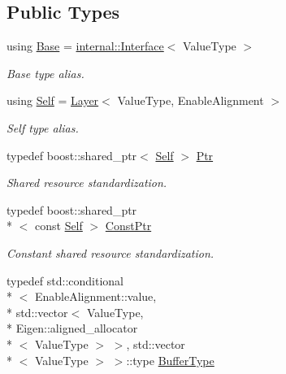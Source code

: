 \subsection*{Public Types}
\begin{DoxyCompactItemize}
\item 
using \hyperlink{classffnn_1_1layer_1_1_layer_aef88481ace189a82a4576931ef964f7d}{Base} = \hyperlink{classffnn_1_1layer_1_1internal_1_1_interface}{internal\-::\-Interface}$<$ Value\-Type $>$
\begin{DoxyCompactList}\small\item\em Base type alias. \end{DoxyCompactList}\item 
using \hyperlink{classffnn_1_1layer_1_1_layer_af2600ebac2bf33f5a1fb3307d7ef1dbc}{Self} = \hyperlink{classffnn_1_1layer_1_1_layer}{Layer}$<$ Value\-Type, Enable\-Alignment $>$
\begin{DoxyCompactList}\small\item\em Self type alias. \end{DoxyCompactList}\item 
typedef boost\-::shared\-\_\-ptr$<$ \hyperlink{classffnn_1_1layer_1_1_layer_af2600ebac2bf33f5a1fb3307d7ef1dbc}{Self} $>$ \hyperlink{classffnn_1_1layer_1_1_layer_a0efb2ac9125e1fa8f905bd4eed765201}{Ptr}
\begin{DoxyCompactList}\small\item\em Shared resource standardization. \end{DoxyCompactList}\item 
typedef boost\-::shared\-\_\-ptr\\*
$<$ const \hyperlink{classffnn_1_1layer_1_1_layer_af2600ebac2bf33f5a1fb3307d7ef1dbc}{Self} $>$ \hyperlink{classffnn_1_1layer_1_1_layer_a6a0d0adbe331d1682e79d0c734fd3c72}{Const\-Ptr}
\begin{DoxyCompactList}\small\item\em Constant shared resource standardization. \end{DoxyCompactList}\item 
typedef std\-::conditional\\*
$<$ Enable\-Alignment\-::value, \\*
std\-::vector$<$ Value\-Type, \\*
Eigen\-::aligned\-\_\-allocator\\*
$<$ Value\-Type $>$ $>$, std\-::vector\\*
$<$ Value\-Type $>$ $>$\-::type \hyperlink{classffnn_1_1layer_1_1_layer_a981f9bea21513a7b61222b1cda9294e7}{Buffer\-Type}

\end{DoxyCompactItemize}
